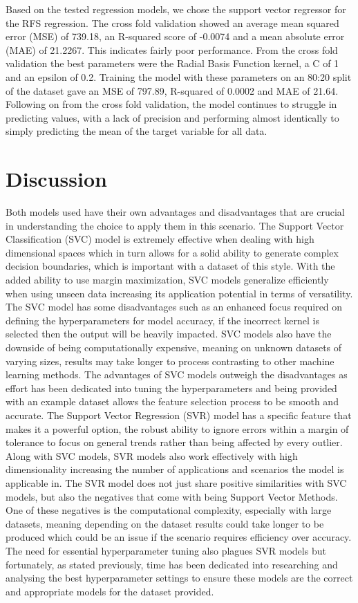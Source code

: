 \documentclass{article}
\begin{document}
Based on the tested regression models, we chose the support vector regressor for the RFS regression. The cross fold validation showed an average mean squared error (MSE) of 739.18, an R-squared score of -0.0074 and a mean absolute error (MAE) of 21.2267. This indicates fairly poor performance. From the cross fold validation the best parameters were the Radial Basis Function kernel, a C of 1 and an epsilon of 0.2. Training the model with these parameters on an 80:20 split of the dataset gave an MSE of 797.89, R-squared of 0.0002 and MAE of 21.64. Following on from the cross fold validation, the model continues to struggle in predicting values, with a lack of precision and performing almost identically to simply predicting the mean of the target variable for all data.

\section{Discussion}

Both models used have their own advantages and disadvantages that are crucial in understanding the choice to apply them in this scenario.
The Support Vector Classification (SVC) model is extremely effective when dealing with high dimensional spaces which in turn allows for a solid ability to generate complex decision boundaries, which is important with a dataset of this style. With the added ability to use margin maximization, SVC models generalize efficiently when using unseen data increasing its application potential in terms of versatility.
The SVC model has some disadvantages such as an enhanced focus required on defining the hyperparameters for model accuracy, if the incorrect kernel is selected then the output will be heavily impacted. SVC models also have the downside of being computationally expensive, meaning on unknown datasets of varying sizes, results may take longer to process contrasting to other machine learning methods.
The advantages of SVC models outweigh the disadvantages as effort has been dedicated into tuning the hyperparameters and being provided with an example dataset allows the feature selection process to be smooth and accurate.
The Support Vector Regression (SVR) model has a specific feature that makes it a powerful option, the robust ability to ignore errors within a margin of tolerance to focus on general trends rather than being affected by every outlier. Along with SVC models, SVR models also work effectively with high dimensionality increasing the number of applications and scenarios the model is applicable in.
The SVR model does not just share positive similarities with SVC models, but also the negatives that come with being Support Vector Methods. One of these negatives is the computational complexity, especially with large datasets, meaning depending on the dataset results could take longer to be produced which could be an issue if the scenario requires efficiency over accuracy.  The need for essential hyperparameter tuning also plagues SVR models but fortunately, as stated previously, time has been dedicated into researching and analysing the best hyperparameter settings to ensure these models are the correct and appropriate models for the dataset provided. 
\end{document}

